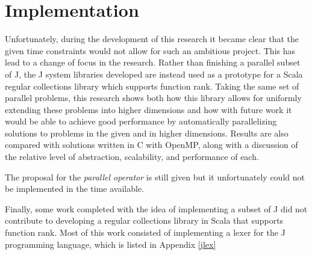 \section{Implementation}
\label{imp}
Unfortunately, during the development of this research it became clear 
that the given time constraints would not allow for such an ambitious project.
This has lead to a change of focus in the research. 
Rather than finishing a parallel subset of J, the J system libraries developed 
are instead used as a prototype for a Scala regular collections library which supports function rank.
Taking the same set of parallel problems, 
this research shows both how this library allows for uniformly extending these problems into higher dimensions and 
how with future work it would be able to achieve good performance 
by automatically parallelizing solutions to problems in the given and in higher dimensions.
Results are also compared with solutions written in C with OpenMP, 
along with a discussion of the relative level of abstraction, scalability, and performance of each.

The proposal for the \textit{parallel operator} is still given but it unfortunately could not be implemented in the time available.

Finally, some work completed with the idea of implementing a subset of J did not contribute to developing a regular collections library in Scala that supports function rank.
Most of this work consisted of implementing a lexer for the J programming language, which is listed in Appendix \ref{jlex}
